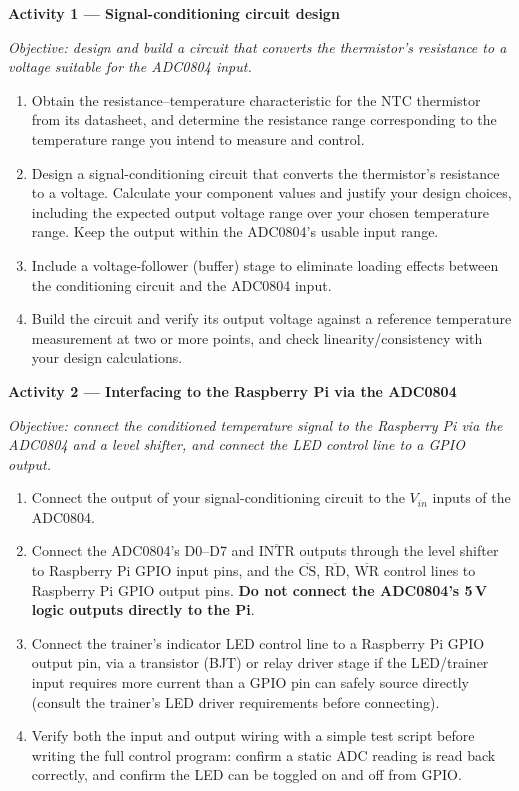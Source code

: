 \begin{procedure}

  \textbf{Activity 1 --- Signal-conditioning circuit design}\vspace{2pt}

  \textit{Objective: design and build a circuit that converts the thermistor's resistance to a voltage suitable for the ADC0804 input.}

  \begin{enumerate}
    \item Obtain the resistance--temperature characteristic for the NTC thermistor from its datasheet, and determine the resistance range corresponding to the temperature range you intend to measure and control.
    \item Design a signal-conditioning circuit that converts the thermistor's resistance to a voltage. Calculate your component values and justify your design choices, including the expected output voltage range over your chosen temperature range. Keep the output within the ADC0804's usable input range.
    \item Include a voltage-follower (buffer) stage to eliminate loading effects between the conditioning circuit and the ADC0804 input.
    \item Build the circuit and verify its output voltage against a reference temperature measurement at two or more points, and check linearity/consistency with your design calculations.
  \end{enumerate}
  \vspace*{1.5em}

  \textbf{Activity 2 --- Interfacing to the Raspberry Pi via the ADC0804}\vspace{2pt}

  \textit{Objective: connect the conditioned temperature signal to the Raspberry Pi via the ADC0804 and a level shifter, and connect the LED control line to a GPIO output.}

  \begin{enumerate}
    \item Connect the output of your signal-conditioning circuit to the $V_{in}$ inputs of the ADC0804.\newpage
    \item Connect the ADC0804's D0--D7 and $\overline{\text{INTR}}$ outputs through the level shifter to Raspberry Pi GPIO input pins, and the $\overline{\text{CS}}$, $\overline{\text{RD}}$, $\overline{\text{WR}}$ control lines to Raspberry Pi GPIO output pins. \textbf{Do not connect the ADC0804's 5\,V logic outputs directly to the Pi}.
    \item Connect the trainer's indicator LED control line to a Raspberry Pi GPIO output pin, via a transistor (BJT) or relay driver stage if the LED/trainer input requires more current than a GPIO pin can safely source directly (consult the trainer's LED driver requirements before connecting).
    \item Verify both the input and output wiring with a simple test script before writing the full control program: confirm a static ADC reading is read back correctly, and confirm the LED can be toggled on and off from GPIO.
  \end{enumerate}


\end{procedure}
